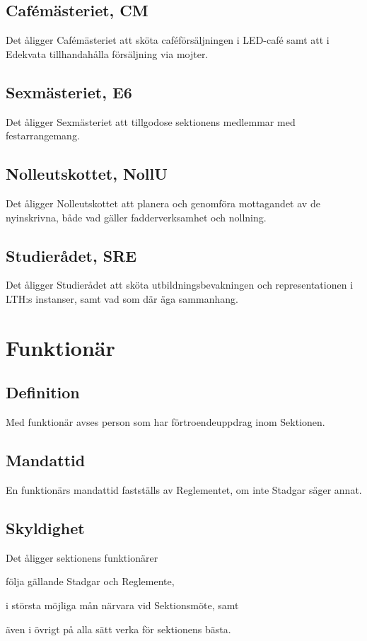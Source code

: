 \documentclass[10pt]{article}
\begin{document}
    \subsection{Cafémästeriet, CM}
    Det åligger Cafémästeriet att sköta caféförsäljningen i LED-café samt att i Edekvata tillhandahålla försäljning via mojter.
    
    \subsection{Sexmästeriet, E6}
    Det åligger Sexmästeriet att tillgodose sektionens medlemmar med
    festarrangemang.
    
    \subsection{Nolleutskottet, NollU}
    Det åligger Nolleutskottet att planera och genomföra mottagandet av
    de nyinskrivna, både vad gäller fadderverksamhet och nollning.
    
    \subsection{Studierådet, SRE}
    Det åligger Studierådet att sköta utbildningsbevakningen och representationen i LTH:s instanser, samt vad som där äga sammanhang.
    
    \newpage
    
    \section{Funktionär}
    \subsection{Definition}
    Med funktionär avses person som har förtroendeuppdrag inom Sektionen.
    
    \subsection{Mandattid}
    En funktionärs mandattid fastställs av Reglementet, om inte Stadgar säger
    annat.
    
    \subsection{Skyldighet}
    Det åligger sektionens funktionärer
    \begin{attlist}
    \item följa gällande Stadgar och Reglemente,
    \item i största möjliga mån närvara vid Sektionsmöte, samt
    \item även i övrigt på alla sätt verka för sektionens bästa.
    \end{attlist}
    
\end{document}
